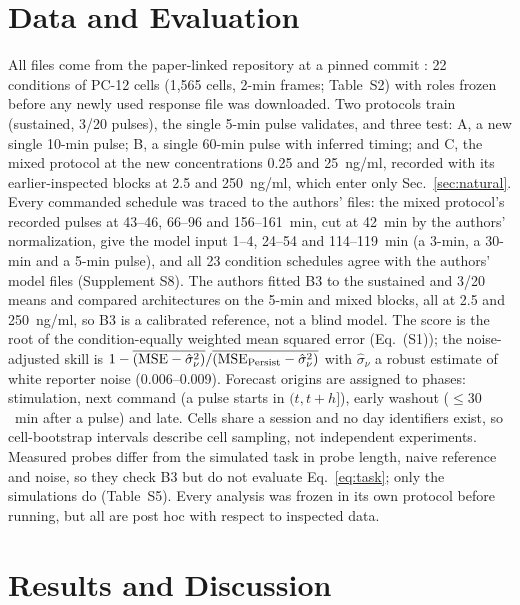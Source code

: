 \documentclass[conference]{IEEEtran}
\begin{document}
\section{Data and Evaluation}
\label{sec:data}
All files come from the paper-linked repository at a pinned commit \cite{lfnsrepo,mendeley2020}: 22 conditions of PC-12 cells (1,565 cells, 2-min frames; Table~S2) with roles frozen before any newly used response file was downloaded. Two protocols train (sustained, 3/20 pulses), the single 5-min pulse validates, and three test: A, a new single 10-min pulse; B, a single 60-min pulse with inferred timing; and C, the mixed protocol at the new concentrations 0.25 and 25~ng/ml, recorded with its earlier-inspected blocks at 2.5 and 250~ng/ml, which enter only Sec.~\ref{sec:natural}. Every commanded schedule was traced to the authors' files: the mixed protocol's recorded pulses at 43--46, 66--96 and 156--161~min, cut at 42~min by the authors' normalization, give the model input 1--4, 24--54 and 114--119~min (a 3-min, a 30-min and a 5-min pulse), and all 23 condition schedules agree with the authors' model files (Supplement S8). The authors fitted B3 to the sustained and 3/20 means and compared architectures on the 5-min and mixed blocks, all at 2.5 and 250~ng/ml, so B3 is a calibrated reference, not a blind model. The score is the root of the condition-equally weighted mean squared error (Eq.~(S1)); the noise-adjusted skill is $1-\overline{(\mathrm{MSE}-\hat\sigma_\nu^2)}/\overline{(\mathrm{MSE}_{\rm Persist}-\hat\sigma_\nu^2)}$ with $\hat\sigma_\nu$ a robust estimate of white reporter noise (0.006--0.009). Forecast origins are assigned to phases: stimulation, next command (a pulse starts in $(t,t+h]$), early washout ($\le30$~min after a pulse) and late. Cells share a session and no day identifiers exist, so cell-bootstrap intervals describe cell sampling, not independent experiments. Measured probes differ from the simulated task in probe length, naive reference and noise, so they check B3 but do not evaluate Eq.~\eqref{eq:task}; only the simulations do (Table~S5). Every analysis was frozen in its own protocol before running, but all are post hoc with respect to inspected data.

\begin{table}[t]
\caption{10-min forecast RMSE on measured cells.}
\label{tab:core}
\centering\footnotesize\setlength{\tabcolsep}{2.5pt}

\end{table}

\section{Results and Discussion}
\label{sec:results}
\end{document}
